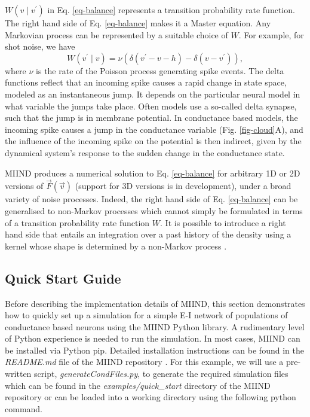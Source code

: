 \documentclass[utf8]{frontiersSCNS} %
\begin{document}
$W(v \mid v^{\prime})$ in Eq. \ref{eq-balance} represents a transition probability rate function. The right hand side of Eq. \ref{eq-balance} makes it a Master equation. Any Markovian process can be represented by a suitable choice of $W$. For example, for shot noise, we have
\begin{equation}   
\label{master_equation}
  W(v^{\prime} \mid v) = \nu (\delta (v^{\prime} - v - h)  - \delta( v - v^{\prime})),  
\end{equation}
where $\nu$ is the rate of the Poisson process generating spike events. The delta functions reflect that an incoming spike causes a rapid change in state space, modeled as an instantaneous jump. It depends on the particular neural model in what variable the jumps take place. Often models use a so-called delta synapse, such that the jump is in membrane potential. In conductance based models, the incoming spike causes a jump in the conductance variable (Fig. \ref{fig-cloud}A), and the influence of the incoming spike on the potential is then indirect, given by the dynamical system's response to the sudden change in the conductance state.

MIIND produces a numerical solution to Eq. \ref{eq-balance} for arbitrary 1D or 2D versions of $\vec{F}(\vec{v})$ (support for 3D versions is in development), under a broad variety of noise processes. Indeed, the right hand side of Eq. \ref{eq-balance} can be generalised to non-Markov processes which cannot simply be formulated in terms of a transition probability rate function $W$. It is possible to introduce a right hand side that entails an integration over a past history of the density using a kernel whose shape is determined by a non-Markov process \citep{lai2017population}.\\

\subsection{Quick Start Guide}
\label{section:quickstart}
Before describing the implementation details of MIIND, this section demonstrates how to quickly set up a simulation for a simple E-I network of populations of conductance based neurons using the MIIND Python library. A rudimentary level of Python experience is needed to run the simulation. In most cases, MIIND can be installed via Python pip. Detailed installation instructions can be found in the \textit{README.md} file of the MIIND repository \citep{miindwebsite}. For this example, we will use a pre-written script, \textit{generateCondFiles.py}, to generate the required simulation files which can be found in the \textit{examples/quick\_start} directory of the MIIND repository or can be loaded into a working directory using the following python command.
\end{document}
